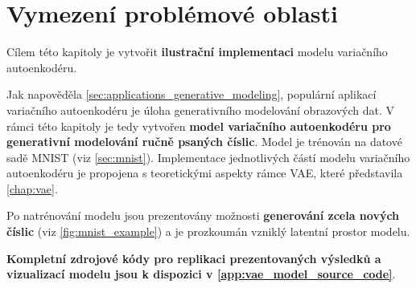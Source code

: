 \section{Vymezení problémové oblasti}
Cílem této kapitoly je vytvořit \textbf{ilustrační implementaci} modelu variačního autoenkodéru.

Jak napověděla \autoref{sec:applications_generative_modeling}, populární aplikací variačního autoenkodéru je úloha generativního modelování obrazových dat.
V rámci této kapitoly je tedy vytvořen \textbf{model variačního autoenkodéru pro generativní modelování ručně psaných číslic}.
Model je trénován na datové sadě MNIST (viz \autoref{sec:mnist}).
Implementace jednotlivých částí modelu variačního autoenkodéru je propojena s teoretickými aspekty rámce VAE, které představila \autoref{chap:vae}.

Po natrénování modelu jsou prezentovány možnosti \textbf{generování zcela nových číslic} (viz \autoref{fig:mnist_example}) a je prozkoumán vzniklý latentní prostor modelu.

\textbf{Kompletní zdrojové kódy pro replikaci prezentovaných výsledků a vizualizací modelu jsou k dispozici v \autoref{app:vae_model_source_code}}.